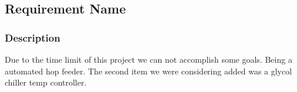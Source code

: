 
\subsection{Requirement Name}
\subsubsection{Description}
Due to the time limit of this project we can not accomplish some goals. Being a automated hop feeder. The second item we were considering added was a glycol chiller temp controller. 